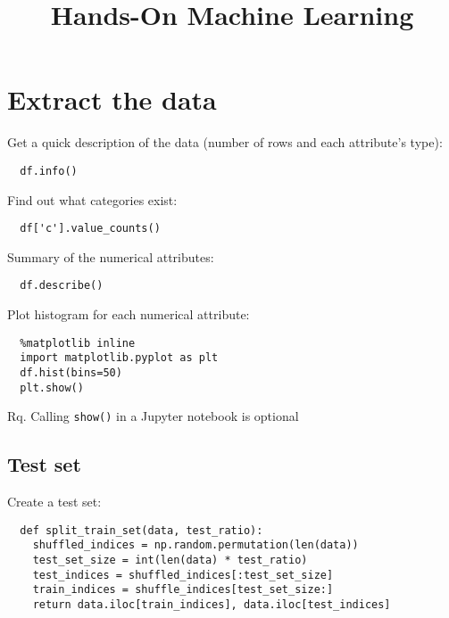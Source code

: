 \documentclass[french]{article}
\title{Hands-On Machine Learning}
\begin{document}
\date{}

\maketitle

\setlength{\parindent}{0cm}

\section{Extract the data}

Get a quick description of the data (number of rows and each attribute's type):
\begin{verbatim}
  df.info()
\end{verbatim}

Find out what categories exist:
\begin{verbatim}
  df['c'].value_counts()
\end{verbatim}

Summary of the numerical attributes:
\begin{verbatim}
  df.describe()
\end{verbatim}

Plot histogram for each numerical attribute:
\begin{verbatim}
  %matplotlib inline
  import matplotlib.pyplot as plt
  df.hist(bins=50)
  plt.show()
\end{verbatim}
Rq. Calling \verb|show()| in a Jupyter notebook is optional


\subsection{Test set}

Create a test set:
\begin{verbatim}
  def split_train_set(data, test_ratio):
    shuffled_indices = np.random.permutation(len(data))
    test_set_size = int(len(data) * test_ratio)
    test_indices = shuffled_indices[:test_set_size]
    train_indices = shuffle_indices[test_set_size:]
    return data.iloc[train_indices], data.iloc[test_indices]
\end{verbatim}
\end{document}
